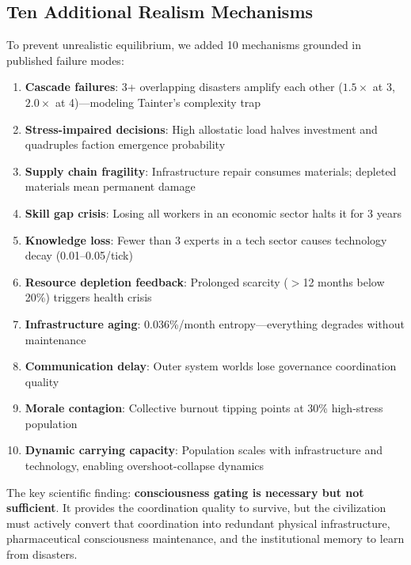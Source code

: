 \documentclass[12pt,a4paper]{article}
\begin{document}
\subsection{Ten Additional Realism Mechanisms}

To prevent unrealistic equilibrium, we added 10 mechanisms grounded in published failure modes:

\begin{enumerate}
    \item \textbf{Cascade failures}: 3+ overlapping disasters amplify each other ($1.5\times$ at 3, $2.0\times$ at 4)---modeling Tainter's complexity trap
    \item \textbf{Stress-impaired decisions}: High allostatic load halves investment and quadruples faction emergence probability
    \item \textbf{Supply chain fragility}: Infrastructure repair consumes materials; depleted materials mean permanent damage
    \item \textbf{Skill gap crisis}: Losing all workers in an economic sector halts it for 3 years
    \item \textbf{Knowledge loss}: Fewer than 3 experts in a tech sector causes technology decay (0.01--0.05/tick)
    \item \textbf{Resource depletion feedback}: Prolonged scarcity ($>$12 months below 20\%) triggers health crisis
    \item \textbf{Infrastructure aging}: 0.036\%/month entropy---everything degrades without maintenance
    \item \textbf{Communication delay}: Outer system worlds lose governance coordination quality
    \item \textbf{Morale contagion}: Collective burnout tipping points at 30\% high-stress population
    \item \textbf{Dynamic carrying capacity}: Population scales with infrastructure and technology, enabling overshoot-collapse dynamics
\end{enumerate}

The key scientific finding: \textbf{consciousness gating is necessary but not sufficient}. It provides the coordination quality to survive, but the civilization must actively convert that coordination into redundant physical infrastructure, pharmaceutical consciousness maintenance, and the institutional memory to learn from disasters.

\end{document}
